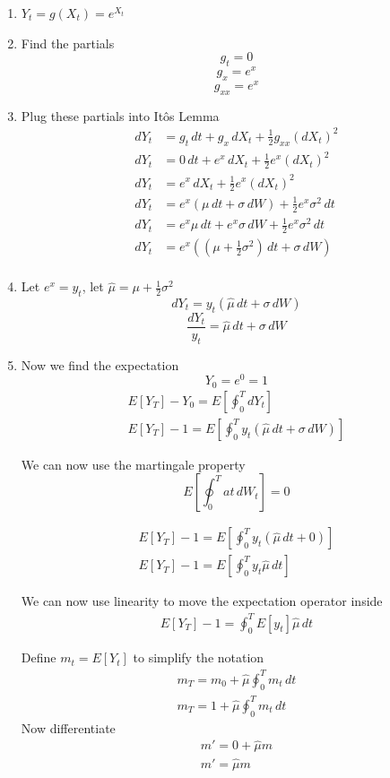 \documentclass[11pt]{article}
\begin{document}
\begin{enumerate}
    \item 
    $Y_t = g(X_t) = e^{X_t}$
    \item Find the partials 
    \[g_t = 0\]
    \[g_x = e^x\]
    \[g_{xx} = e^{x}\]
    \item Plug these partials into It\^{o}s Lemma
    \begin{align*}
        dY_t &= g_t \,dt + g_x \,dX_t + \frac{1}{2} g_{xx} {(dX_t)}^2 \\
        dY_t &= 0 \,dt + e^x \,dX_t + \frac{1}{2} e^{x} {(dX_t)}^2 \\
        dY_t &= e^x \,dX_t + \frac{1}{2} e^{x} {(dX_t)}^2 \\
        dY_t &= e^x (\mu \,dt + \sigma \,dW) + \frac{1}{2} e^{x} \sigma^2 \,dt \\
        dY_t &= e^x\mu \,dt + e^x\sigma \,dW + \frac{1}{2} e^{x} \sigma^2 \,dt \\
        dY_t &= e^x((\mu + \frac{1}{2} \sigma^2) \,dt + \sigma \,dW)  \\
    \end{align*}
    \item Let $e^x = y_t$, let $\hat{\mu} = \mu + \frac{1}{2} \sigma^2$
        \[dY_t = y_t(\hat{\mu} \,dt + \sigma \,dW) \]
        \[\frac{dY_t}{y_t} = \hat{\mu} \,dt + \sigma \,dW \]
    \item Now we find the expectation 
    \[Y_0 = e^0 = 1\]
    \begin{align*}
        E[Y_T] - Y_0 = E \left[\oint_0^T dY_t\right] \\
        E[Y_T] - 1 = E \left[\oint_0^T y_t(\hat{\mu} \,dt + \sigma \,dW) \right]         
    \end{align*}

    We can now use the martingale property 
    \[ E\left[\oint_{0}^{T} at \, dW_t \right] = 0\]

    \begin{align*}
        E[Y_T] - 1 = E \left[\oint_0^T y_t(\hat{\mu} \,dt + 0) \right] \\
        E[Y_T] - 1 = E \left[\oint_0^T y_t \hat{\mu} \,dt \right]         
    \end{align*}

    We can now use linearity to move the expectation operator inside
    \begin{align*}
        E[Y_T] - 1 = \oint_0^T  E [y_t] \hat{\mu} \,dt     
    \end{align*}

    Define $m_t = E[Y_t]$ to simplify the notation
    \begin{align*}
        m_T = m_0 + \hat{\mu} \oint_0^T m_t \,dt \\
        m_T = 1 + \hat{\mu} \oint_0^T m_t \,dt
    \end{align*}
    Now differentiate
    \begin{align*}
        m' = 0 + \hat{\mu} m \\
        m' = \hat{\mu} m \\
    \end{align*}


\end{enumerate}
\end{document}
